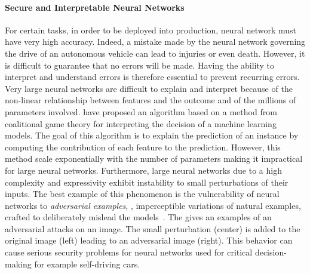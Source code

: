\paragraph{Secure and Interpretable Neural Networks}
For certain tasks, in order to be deployed into production, neural network must have very high accuracy.
Indeed, a mistake made by the neural network governing the drive of an autonomous vehicle can lead to injuries or even death.
However, it is difficult to guarantee that no errors will be made.
Having the ability to interpret and understand errors is therefore essential to prevent recurring errors.
Very large neural networks are difficult to explain and interpret because of the non-linear relationship between features and the outcome and of the millions of parameters involved.
\citet{lundberg2017unified} have proposed an algorithm based on a method from coalitional game theory for interpreting the decision of a machine learning models. 
The goal of this algorithm is to explain the prediction of an instance by computing the contribution of each feature to the prediction.
However, this method scale exponentially with the number of parameters making it impractical for large neural networks.
Furthermore, large neural networks due to a high complexity and expressivity exhibit instability to small perturbations of their inputs.
The best example of this phenomenon is the vulnerability of neural networks to \emph{adversarial examples}, \ie, imperceptible variations of natural examples, crafted to deliberately mislead the models~\cite{globerson2006nightmare,biggio2013evasion,szegedy2013intriguing}.
The  gives an examples of an adversarial attacks on an image. The small perturbation (center) is added to the original image (left) leading to an adversarial image (right).
This behavior can cause serious security problems for neural networks used for critical decision-making for example self-driving cars.


